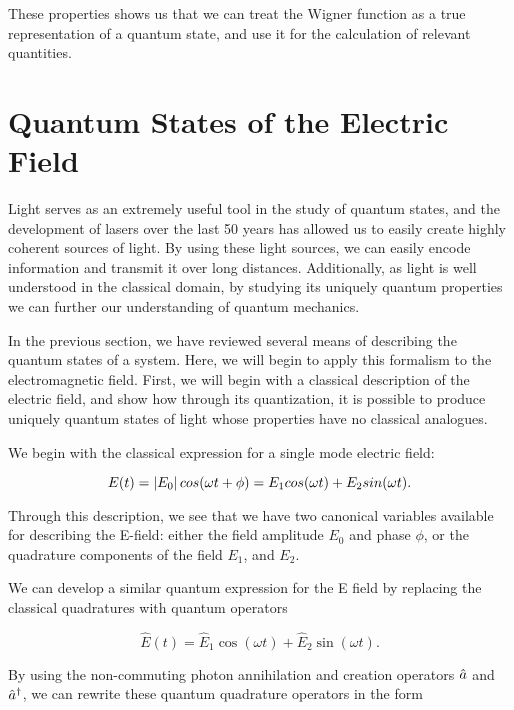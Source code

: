 \noindent
These properties shows us that we can treat the Wigner function as a true representation of a quantum state, and use it for the calculation of relevant quantities.



\section{Quantum States of the Electric Field} 
\label{quantum_states_of_the_electric_field} 

Light serves as an extremely useful tool in the study of quantum states, and
the development of lasers over the last 50 years has allowed us to easily
create highly coherent sources of light.  By using these light sources, we can
easily encode information and transmit it over long distances.  Additionally, as light is well understood in the classical domain, by studying its uniquely quantum properties we can further our understanding of quantum mechanics.  

In the previous section, we have reviewed several means of describing the quantum states of a system.  Here, we will begin to apply this formalism to the electromagnetic field.  First, we will begin with a classical description of the electric field, and show how through its quantization, it is possible to produce uniquely quantum states of light whose properties have no classical analogues.  

We begin with the classical expression for a single mode electric field:

\begin{equation}
  \label{eq:classical_e_field}
  E(t) = \left| E_{0} \right| cos(\omega t + \phi )  = E_1 cos(\omega t) + E_2
sin( \omega t).
\end{equation}

\noindent
Through this description, we see that we have two canonical variables available for describing the E-field: either the field amplitude $E_0$ and phase $\phi$,  or the quadrature components of the field $E_1$, and $E_2$.
  
We can develop a similar quantum expression for the E field by replacing the classical quadratures with quantum operators

\begin{equation}
  \label{eq:quantum_e_field}
     \hat{E}(t) = \hat{E}_1 \cos(\omega t) + \hat{E}_2 \sin (\omega t).
\end{equation}

\noindent
By using the non-commuting photon annihilation and creation operators $\hat{a}$ and $\hat{a}^\dagger$, we can rewrite these quantum quadrature operators in the form

